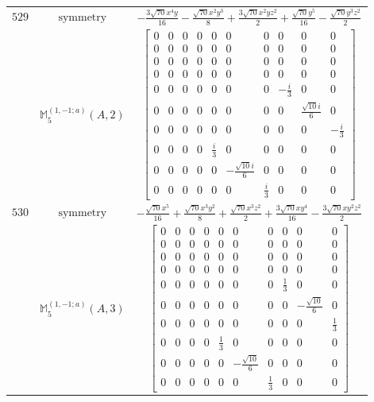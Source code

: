 \documentclass[fleqn,8pt,landscape]{jsarticle}
\begin{document}
\begin{longtable}{ccc}
$ 529 $ & $ \text{symmetry} $ & $ - \frac{3 \sqrt{70} x^{4} y}{16} - \frac{\sqrt{70} x^{2} y^{3}}{8} + \frac{3 \sqrt{70} x^{2} y z^{2}}{2} + \frac{\sqrt{70} y^{5}}{16} - \frac{\sqrt{70} y^{3} z^{2}}{2} $ \\
$  $ & $ \mathbb{M}_{5}^{(1,-1;a)}(A,2) $ & $ \begin{bmatrix} 0 & 0 & 0 & 0 & 0 & 0 & 0 & 0 & 0 & 0 \\ 0 & 0 & 0 & 0 & 0 & 0 & 0 & 0 & 0 & 0 \\ 0 & 0 & 0 & 0 & 0 & 0 & 0 & 0 & 0 & 0 \\ 0 & 0 & 0 & 0 & 0 & 0 & 0 & 0 & 0 & 0 \\ 0 & 0 & 0 & 0 & 0 & 0 & 0 & - \frac{i}{3} & 0 & 0 \\ 0 & 0 & 0 & 0 & 0 & 0 & 0 & 0 & \frac{\sqrt{10} i}{6} & 0 \\ 0 & 0 & 0 & 0 & 0 & 0 & 0 & 0 & 0 & - \frac{i}{3} \\ 0 & 0 & 0 & 0 & \frac{i}{3} & 0 & 0 & 0 & 0 & 0 \\ 0 & 0 & 0 & 0 & 0 & - \frac{\sqrt{10} i}{6} & 0 & 0 & 0 & 0 \\ 0 & 0 & 0 & 0 & 0 & 0 & \frac{i}{3} & 0 & 0 & 0 \end{bmatrix} $ \\ \hline
$ 530 $ & $ \text{symmetry} $ & $ - \frac{\sqrt{70} x^{5}}{16} + \frac{\sqrt{70} x^{3} y^{2}}{8} + \frac{\sqrt{70} x^{3} z^{2}}{2} + \frac{3 \sqrt{70} x y^{4}}{16} - \frac{3 \sqrt{70} x y^{2} z^{2}}{2} $ \\
$  $ & $ \mathbb{M}_{5}^{(1,-1;a)}(A,3) $ & $ \begin{bmatrix} 0 & 0 & 0 & 0 & 0 & 0 & 0 & 0 & 0 & 0 \\ 0 & 0 & 0 & 0 & 0 & 0 & 0 & 0 & 0 & 0 \\ 0 & 0 & 0 & 0 & 0 & 0 & 0 & 0 & 0 & 0 \\ 0 & 0 & 0 & 0 & 0 & 0 & 0 & 0 & 0 & 0 \\ 0 & 0 & 0 & 0 & 0 & 0 & 0 & \frac{1}{3} & 0 & 0 \\ 0 & 0 & 0 & 0 & 0 & 0 & 0 & 0 & - \frac{\sqrt{10}}{6} & 0 \\ 0 & 0 & 0 & 0 & 0 & 0 & 0 & 0 & 0 & \frac{1}{3} \\ 0 & 0 & 0 & 0 & \frac{1}{3} & 0 & 0 & 0 & 0 & 0 \\ 0 & 0 & 0 & 0 & 0 & - \frac{\sqrt{10}}{6} & 0 & 0 & 0 & 0 \\ 0 & 0 & 0 & 0 & 0 & 0 & \frac{1}{3} & 0 & 0 & 0 \end{bmatrix} $ \\ \hline

\end{longtable}
\end{document}

